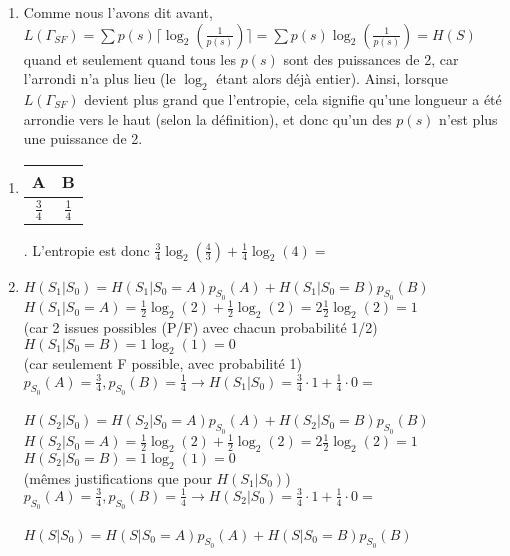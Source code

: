\documentclass[10pt,a4paper]{article}
\begin{document}
\begin{enumerate}
\begin{enumerate}[label=(\alph*)]
			\item Comme nous l'avons dit avant, $L(\Gamma_{SF}) = \sum p(s)\lceil\log_2(\frac{1}{p(s)})\rceil = \sum p(s)\log_2(\frac{1}{p(s)}) = H(S)$ quand et seulement quand tous les $p(s)$ sont des puissances de 2, car l'arrondi n'a plus lieu (le $\log_2$ étant alors déjà entier). Ainsi, lorsque $L(\Gamma_{SF})$ devient plus grand que l'entropie, cela signifie qu'une longueur a été arrondie vers le haut (selon la définition), et donc qu'un des $p(s)$ n'est plus une puissance de 2.
		\end{enumerate}
\end{enumerate}
\begin{enumerate}
	\item \begin{tabular}{c|c}
	A & B\\
	\hline
	$\frac{3}{4}$ & $\frac{1}{4}$
	\end{tabular}. L'entropie est donc $\frac{3}{4}\log_2\left(\frac{4}{3}\right) + \frac{1}{4}\log_2(4) = $ 
	\item $H(S_1|S_0) = H(S_1|S_0 = A)p_{S_0}(A) + H(S_1|S_0 = B)p_{S_0}(B)$\\
		$H(S_1|S_0 = A) = \frac{1}{2}\log_2(2) + \frac{1}{2}\log_2(2) = 2\frac{1}{2}\log_2(2) = 1$\\ \big(car 2 issues possibles (P/F) avec chacun probabilité 1/2\big)\\
		$H(S_1|S_0 = B) = 1\log_2(1) = 0$\\ \big(car seulement F possible, avec probabilité 1\big)\\	
		$p_{S_0}(A) = \frac{3}{4}, p_{S_0}(B) = \frac{1}{4} \to H(S_1|S_0) = \frac{3}{4}\cdot 1 + \frac{1}{4}\cdot 0 = $ \\
		\\
		$H(S_2|S_0) = H(S_2|S_0 = A)p_{S_0}(A) + H(S_2|S_0 = B)p_{S_0}(B)$\\
		$H(S_2|S_0 = A) = \frac{1}{2}\log_2(2) + \frac{1}{2}\log_2(2) = 2\frac{1}{2}\log_2(2) = 1$\\
		$H(S_2|S_0 = B) = 1\log_2(1) = 0$\\
		(mêmes justifications que pour $H(S_1|S_0)$)\\
		$p_{S_0}(A) = \frac{3}{4}, p_{S_0}(B) = \frac{1}{4} \to H(S_2|S_0) = \frac{3}{4}\cdot 1 + 	\frac{1}{4}\cdot 0 = $ \\
		\\
		$H(S|S_0) = H(S|S_0=A)p_{S_0}(A) + H(S|S_0=B)p_{S_0}(B)$\\

\end{enumerate}
\end{document}
